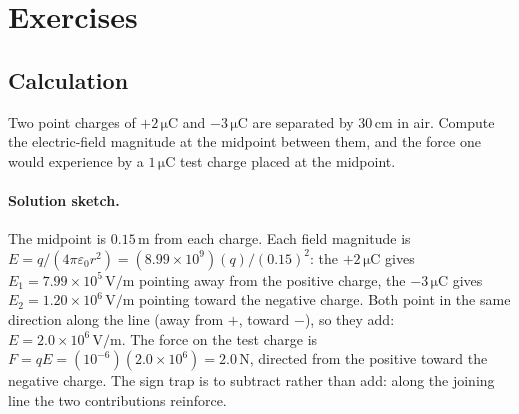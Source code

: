 \section{Exercises}

\subsection*{Calculation}

\begin{exercise}
Two point charges of $+2\,\si{\micro\coulomb}$ and $-3\,\si{\micro
\coulomb}$ are separated by $30\,\si{\centi\meter}$ in air. Compute
the electric-field magnitude at the midpoint between them, and the
force one would experience by a $1\,\si{\micro\coulomb}$ test charge
placed at the midpoint.

\paragraph{Solution sketch.} The midpoint is $0.15\,\si{\meter}$ from
each charge. Each field magnitude is $E = q/(4\pi\varepsilon_0 r^2) =
(8.99\times 10^9)(q)/(0.15)^2$: the $+2\,\si{\micro\coulomb}$ gives
$E_1 = 7.99\times 10^{5}\,\si{\volt\per\meter}$ pointing away from the
positive charge, the $-3\,\si{\micro\coulomb}$ gives $E_2 = 1.20\times
10^{6}\,\si{\volt\per\meter}$ pointing toward the negative charge. Both
point in the same direction along the line (away from $+$, toward $-$),
so they add: $E = 2.0\times 10^{6}\,\si{\volt\per\meter}$. The force on
the test charge is $F = qE = (10^{-6})(2.0\times 10^{6}) = 2.0\,\si{
\newton}$, directed from the positive toward the negative charge. The
sign trap is to subtract rather than add: along the joining line the
two contributions reinforce.
\end{exercise}

